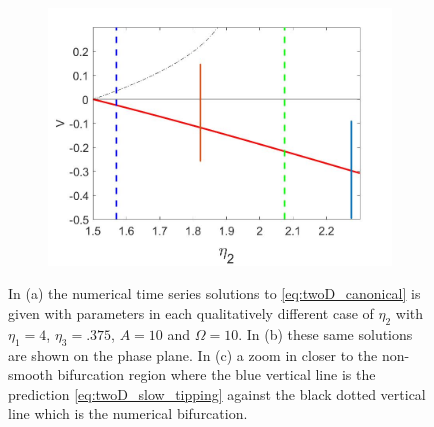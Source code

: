 \begin{figure}[H]
\begin{subfigure}{.5\textwidth}
  \includegraphics[width=\linewidth]{twoD/osc_bif_diagram_zoom.jpg}
  \caption{}
\end{subfigure}
\caption{In (a) the numerical time series solutions to \eqref{eq:twoD_canonical} is given with parameters in each qualitatively different case of $\eta_2$ with $\eta_1=4$, $\eta_3=.375$, $A=10$ and $\Omega = 10$. In (b) these same solutions are shown on the phase plane. In (c) a zoom in closer to the non-smooth bifurcation region where the blue vertical line is the prediction \eqref{eq:twoD_slow_tipping} against the black dotted vertical line which is the numerical bifurcation.}
\label{fig:twoD_osc_Vnumerics}
\end{figure}

